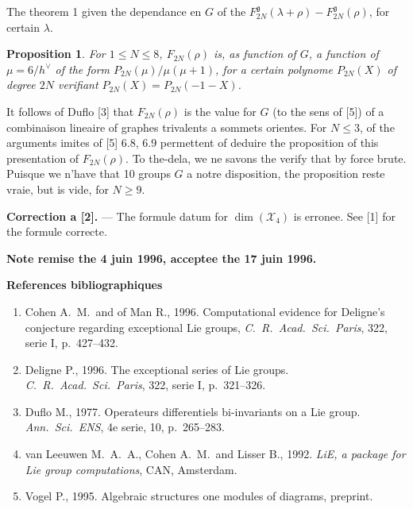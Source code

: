 \documentclass[11pt,a4paper]{article}
\theoremstyle{plain}
\newtheorem{proposition}[theorem]{Proposition}
\theoremstyle{definition}
\begin{document}
The theorem 1 given the dependance en $G$ of the $F_{2N}^{\mathfrak{g}}(\lambda + \rho) - F_{2N}^{\mathfrak{g}}(\rho)$, for certain $\lambda$.

\begin{proposition}\label{prop:2}
For $1 \leq N \leq 8$, $F_{2N}(\rho)$ is, as function of $G$, a function of $\mu = 6/h^\vee$ of the form $P_{2N}(\mu)/\mu(\mu+1)$, for a certain polynome $P_{2N}(X)$ of degree $2N$ verifiant $P_{2N}(X) = P_{2N}(-1-X)$.
\end{proposition}

It follows of Duflo [3] that $F_{2N}(\rho)$ is the value for $G$ (to the sens of [5]) of a combinaison lineaire of graphes trivalents a sommets orientes. For $N \leq 3$, of the arguments imites of [5] 6.8, 6.9 permettent of deduire the proposition of this presentation of $F_{2N}(\rho)$. To the-dela, we ne savons the verify that by force brute. Puisque we n'have that 10 groups $G$ a notre disposition, the proposition reste vraie, but is vide, for $N \geq 9$.

\bigskip

\textbf{Correction a [2].} --- The formule datum for $\dim(\mathcal{X}_4)$ is erronee. See [1] for the formule correcte.

\bigskip

\noindent\textbf{Note remise the 4 juin 1996, acceptee the 17 juin 1996.}

\bigskip

\begin{center}
\textbf{References bibliographiques}
\end{center}

\begin{enumerate}
\item[{[1]}] Cohen A.\ M.\ and of Man R., 1996. Computational evidence for Deligne's conjecture regarding exceptional Lie groups, \textit{C.\ R.\ Acad.\ Sci.\ Paris}, 322, serie I, p.~427--432.

\item[{[2]}] Deligne P., 1996. The exceptional series of Lie groups. \textit{C.\ R.\ Acad.\ Sci.\ Paris}, 322, serie I, p.~321--326.

\item[{[3]}] Duflo M., 1977. Operateurs differentiels bi-invariants on a Lie group. \textit{Ann.\ Sci.\ ENS}, 4e serie, 10, p.~265--283.

\item[{[4]}] van Leeuwen M.\ A.\ A., Cohen A.\ M.\ and Lisser B., 1992. \textit{LiE, a package for Lie group computations}, CAN, Amsterdam.

\item[{[5]}] Vogel P., 1995. Algebraic structures one modules of diagrams, preprint.
\end{enumerate}
\end{document}
